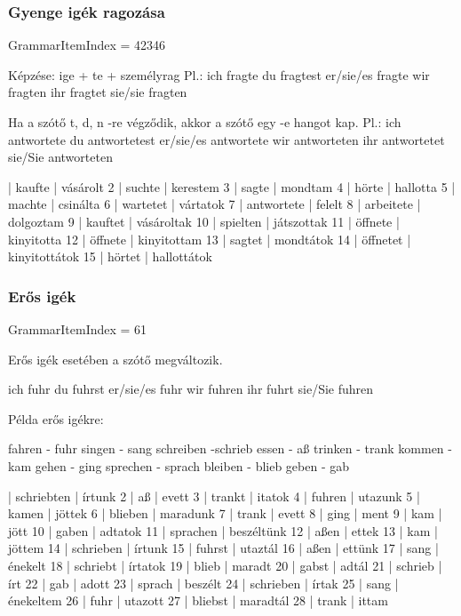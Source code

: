 \documentclass{article}
\newenvironment{desc}{\verbatim}{\endverbatim}
\newenvironment{exmp}{\verbatim}{\endverbatim}
\begin{document}
\subsubsection{Gyenge igék ragozása}

GrammarItemIndex = 42346

\begin{desc}
Képzése: ige + te + személyrag
Pl.:
ich fragte
du fragtest
er/sie/es fragte
wir fragten
ihr fragtet
sie/sie fragten

Ha a szótő t, d, n -re végződik, akkor a szótő egy -e hangot kap.
Pl.:
ich antwortete
du antwortetest
er/sie/es antwortete
wir antworteten
ihr antwortetet
sie/Sie antworteten
\end{desc}

\begin{exmp}
1 | kaufte | vásárolt
2 | suchte | kerestem
3 | sagte | mondtam
4 | hörte | hallotta
5 | machte | csinálta
6 | wartetet | vártatok
7 | antwortete | felelt
8 | arbeitete | dolgoztam
9 | kauftet | vásároltak
10 | spielten | játszottak
11 | öffnete | kinyitotta
12 | öffnete | kinyitottam
13 | sagtet | mondtátok
14 | öffnetet | kinyitottátok
15 | hörtet | hallottátok
\end{exmp}

\subsubsection{Erős igék}

GrammarItemIndex = 61

\begin{desc}
Erős igék esetében a szótő megváltozik.

ich fuhr
du fuhrst
er/sie/es fuhr
wir fuhren
ihr fuhrt
sie/Sie fuhren

Példa erős igékre:

fahren - fuhr
singen - sang
schreiben -schrieb
essen - aß
trinken - trank
kommen - kam
gehen - ging
sprechen - sprach
bleiben - blieb
geben - gab

\end{desc}

\begin{exmp}
1 | schriebten | írtunk
2 | aß | evett
3 | trankt | itatok
4 | fuhren | utazunk
5 | kamen | jöttek
6 | blieben | maradunk
7 | trank | evett
8 | ging | ment
9 | kam | jött
10 | gaben | adtatok
11 | sprachen | beszéltünk
12 | aßen | ettek
13 | kam | jöttem
14 | schrieben | írtunk
15 | fuhrst | utaztál
16 | aßen | ettünk
17 | sang | énekelt
18 | schriebt | írtatok
19 | blieb | maradt
20 | gabst | adtál
21 | schrieb | írt
22 | gab | adott
23 | sprach | beszélt
24 | schrieben | írtak
25 | sang | énekeltem
26 | fuhr | utazott
27 | bliebst | maradtál
28 | trank | ittam
\end{exmp}
\end{document}
